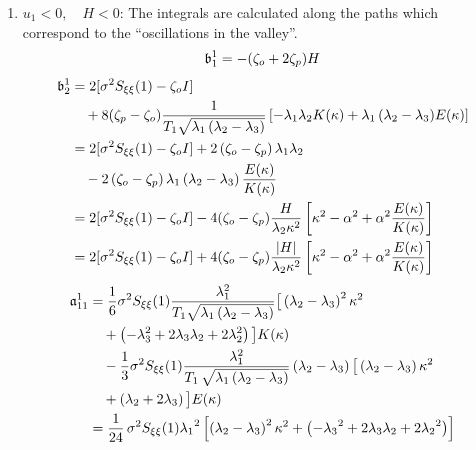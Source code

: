 \begin{enumerate}
\item $u_1 < 0, \quad H < 0$: The integrals are calculated along the paths which correspond to the ``oscillations in the valley''.
\begin{equation}
\mathfrak b_1^1 = -(\zeta_o + 2 \zeta_p) H \label{e:b1 valley}\\
\end{equation}
\begin{align*}
\mathfrak b_2^1 &= 2 [\sigma^2 S_{\xi\xi}(1) - \zeta_o I]\notag\\
&\quad + 8 (\zeta_p - \zeta_o) \frac{1}{T_1 \sqrt{\lambda_1 \left(\lambda_2-\lambda_3 \right)}} \left[-\lambda_1 \lambda_2 K(\kappa) + {\lambda_1\left(\lambda_2-\lambda_3 \right)} E(\kappa) \right]\notag\\
& = 2[\sigma^2 S_{\xi\xi}(1) - \zeta_o I] +2 \left(\zeta_o - \zeta_p\right) \lambda_1 \lambda_2\notag\\
&\quad - 2 \left(\zeta_o - \zeta_p\right) \lambda_1 \left(\lambda_2 - \lambda_3\right) \frac{E(\kappa)}{K(\kappa)}\notag\\
& = 2 [\sigma^2 S_{\xi\xi}(1) - \zeta_o I] - 4 (\zeta_o - \zeta_p) \frac{H}{\lambda_2 \kappa^2} \left[ \kappa^2 - \alpha^2 + \alpha^2 \frac{E(\kappa)}{K(\kappa)}\right]\notag\\
& = 2 [\sigma^2 S_{\xi\xi}(1) - \zeta_o I] + 4 (\zeta_o - \zeta_p) \frac{|H|}{\lambda_2 \kappa^2} \left[ \kappa^2 - \alpha^2 + \alpha^2 \frac{E(\kappa)}{K(\kappa)}\right]
\end{align*}
\begin{align*}
\Aa_{11}^1 &= \frac{1}{6}{\sigma}^2 S_{\xi\xi}(1) \frac{\lambda_1^2}{T_1 \sqrt{\lambda_1 \left(\lambda_2 - \lambda_3 \right)}} \big[\left(\lambda_2 - \lambda_3 \right)^2 \kappa^2\\
&\quad + \left(-\lambda_3^2 + 2 \lambda_3 \lambda_2 + 2 \lambda_2^2\right)\big] K(\kappa) \\
&\quad -\frac{1}{3} {\sigma}^2 S_{\xi\xi}(1)\frac {\lambda_1^2}
{T_1\,\sqrt {\lambda_1\left(\lambda_2-\lambda_3\right)} }\left
(\lambda_2-\lambda_3\right) \big[\left(\lambda_2 - \lambda_3 \right)\kappa^2\\
&\quad + \left(\lambda_2 + 2\lambda_3\right)\big] E(\kappa)\\
& = \frac{1}{24}\,{\sigma}^2S_{\xi\xi}(1){\lambda_1}^2
\left[\left(\lambda_2-\lambda_3\right)^2{\kappa}^2 + \left
(-{\lambda_3}^2 + 2 \lambda_3 \lambda_2 + 2 {\lambda_2}^2\right)\right]\\

\end{align*}
\end{enumerate}
